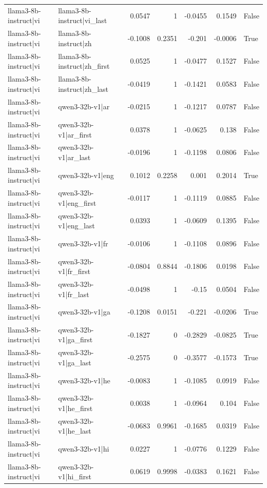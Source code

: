 \begin{table}
\begin{tabular}{l l r r r r l}
llama3-8b-instruct|vi & llama3-8b-instruct|vi_last & 0.0547 & 1 & -0.0455 & 0.1549 & False \\
llama3-8b-instruct|vi & llama3-8b-instruct|zh & -0.1008 & 0.2351 & -0.201 & -0.0006 & True \\
llama3-8b-instruct|vi & llama3-8b-instruct|zh_first & 0.0525 & 1 & -0.0477 & 0.1527 & False \\
llama3-8b-instruct|vi & llama3-8b-instruct|zh_last & -0.0419 & 1 & -0.1421 & 0.0583 & False \\
llama3-8b-instruct|vi & qwen3-32b-v1|ar & -0.0215 & 1 & -0.1217 & 0.0787 & False \\
llama3-8b-instruct|vi & qwen3-32b-v1|ar_first & 0.0378 & 1 & -0.0625 & 0.138 & False \\
llama3-8b-instruct|vi & qwen3-32b-v1|ar_last & -0.0196 & 1 & -0.1198 & 0.0806 & False \\
llama3-8b-instruct|vi & qwen3-32b-v1|eng & 0.1012 & 0.2258 & 0.001 & 0.2014 & True \\
llama3-8b-instruct|vi & qwen3-32b-v1|eng_first & -0.0117 & 1 & -0.1119 & 0.0885 & False \\
llama3-8b-instruct|vi & qwen3-32b-v1|eng_last & 0.0393 & 1 & -0.0609 & 0.1395 & False \\
llama3-8b-instruct|vi & qwen3-32b-v1|fr & -0.0106 & 1 & -0.1108 & 0.0896 & False \\
llama3-8b-instruct|vi & qwen3-32b-v1|fr_first & -0.0804 & 0.8844 & -0.1806 & 0.0198 & False \\
llama3-8b-instruct|vi & qwen3-32b-v1|fr_last & -0.0498 & 1 & -0.15 & 0.0504 & False \\
llama3-8b-instruct|vi & qwen3-32b-v1|ga & -0.1208 & 0.0151 & -0.221 & -0.0206 & True \\
llama3-8b-instruct|vi & qwen3-32b-v1|ga_first & -0.1827 & 0 & -0.2829 & -0.0825 & True \\
llama3-8b-instruct|vi & qwen3-32b-v1|ga_last & -0.2575 & 0 & -0.3577 & -0.1573 & True \\
llama3-8b-instruct|vi & qwen3-32b-v1|he & -0.0083 & 1 & -0.1085 & 0.0919 & False \\
llama3-8b-instruct|vi & qwen3-32b-v1|he_first & 0.0038 & 1 & -0.0964 & 0.104 & False \\
llama3-8b-instruct|vi & qwen3-32b-v1|he_last & -0.0683 & 0.9961 & -0.1685 & 0.0319 & False \\
llama3-8b-instruct|vi & qwen3-32b-v1|hi & 0.0227 & 1 & -0.0776 & 0.1229 & False \\
llama3-8b-instruct|vi & qwen3-32b-v1|hi_first & 0.0619 & 0.9998 & -0.0383 & 0.1621 & False \\

\end{tabular}
\end{table}
